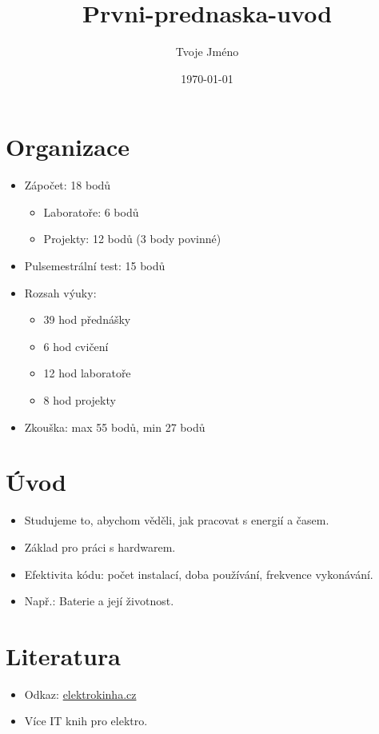 \documentclass{article}
\title{Prvni-prednaska-uvod}
\author{Tvoje Jméno}
\date{\today}
\begin{document}
\maketitle

\section{Organizace}
\begin{itemize}
    \item Zápočet: 18 bodů
    \begin{itemize}
        \item Laboratoře: 6 bodů
        \item Projekty: 12 bodů (3 body povinné)
    \end{itemize}
    \item Pulsemestrální test: 15 bodů
    \item Rozsah výuky:
    \begin{itemize}
        \item 39 hod přednášky
        \item 6 hod cvičení
        \item 12 hod laboratoře
        \item 8 hod projekty
    \end{itemize}
    \item Zkouška: max 55 bodů, min 27 bodů
\end{itemize}

\section{Úvod}
\begin{itemize}
    \item Studujeme to, abychom věděli, jak pracovat s energií a časem.
    \item Základ pro práci s hardwarem.
    \item Efektivita kódu: počet instalací, doba používání, frekvence vykonávání.
    \item Např.: Baterie a její životnost.
\end{itemize}

\section{Literatura}
\begin{itemize}
    \item Odkaz: \href{http://elektrokinha.cz/}{elektrokinha.cz}
    \item Více IT knih pro elektro.
\end{itemize}
\end{document}
